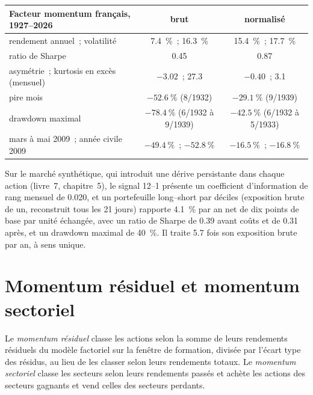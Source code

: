 \begin{center}
\small
\begin{tabular}{@{}lcc@{}}
\toprule
Facteur momentum français, 1927--2026 & brut & normalisé\\
\midrule
rendement annuel~; volatilité & 7.4~\%~; 16.3~\% & 15.4~\%~; 17.7~\%\\
ratio de Sharpe & 0.45 & 0.87\\
asymétrie~; kurtosis en excès (mensuel) & $-3.02$~; 27.3 & $-0.40$~; 3.1\\
pire mois & $-52.6~\%$ (8/1932) & $-29.1~\%$ (9/1939)\\
drawdown maximal & $-78.4~\%$ (6/1932 à 9/1939) & $-42.5~\%$ (6/1932 à 5/1933)\\
mars à mai 2009~; année civile 2009 & $-49.4~\%$~; $-52.8~\%$ & $-16.5~\%$~; $-16.8~\%$\\
\bottomrule
\end{tabular}
\end{center}

Sur le marché synthétique, qui introduit une dérive persistante dans chaque action (livre~7, chapitre~5), le signal 12--1 présente un coefficient d'information de rang mensuel de
0.020, et un portefeuille long--short par déciles (exposition brute de un, reconstruit tous les 21 jours) rapporte 4.1~\% par an net de dix points de base par unité échangée, avec un ratio de
Sharpe de 0.39 avant coûts et de 0.31 après, et un drawdown maximal de 40~\%. Il traite 5.7 fois son exposition brute par an, à sens unique.

\section{Momentum résiduel et momentum sectoriel}

\begin{definition}\label{def:s1:momentum:residual}
Le \emph{momentum résiduel} classe les actions selon la somme de leurs rendements résiduels du modèle factoriel sur la fenêtre de formation, divisée par
l'écart type des résidus, au lieu de les classer selon leurs rendements totaux. Le \emph{momentum sectoriel} classe les secteurs selon leurs rendements passés
et achète les actions des secteurs gagnants et vend celles des secteurs perdants.
\end{definition}

